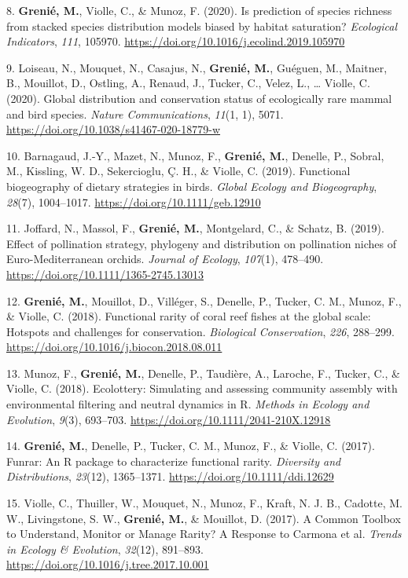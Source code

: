 \documentclass[10pt,a4paper,]{article}
\newlength{\cslhangindent}
\newenvironment{CSLReferences}[2] %
 {\begin{list}{}{%
  \setlength{\itemindent}{0pt}
  \setlength{\leftmargin}{0pt}
  \setlength{\parsep}{0pt}
  \ifodd #1
   \setlength{\leftmargin}{\cslhangindent}
   \setlength{\itemindent}{-1\cslhangindent}
  \fi
  \setlength{\itemsep}{#2\baselineskip}}}
 {\end{list}}
\begin{document}
\begin{CSLReferences}{1}{1}
8. \textbf{Grenié, M.}, Violle, C., \& Munoz, F. (2020). Is prediction
of species richness from stacked species distribution models biased by
habitat saturation? \emph{Ecological Indicators}, \emph{111}, 105970.
\url{https://doi.org/10.1016/j.ecolind.2019.105970}

9. Loiseau, N., Mouquet, N., Casajus, N., \textbf{Grenié, M.}, Guéguen,
M., Maitner, B., Mouillot, D., Ostling, A., Renaud, J., Tucker, C.,
Velez, L., \ldots{} Violle, C. (2020). Global distribution and
conservation status of ecologically rare mammal and bird species.
\emph{Nature Communications}, \emph{11}(1, 1), 5071.
\url{https://doi.org/10.1038/s41467-020-18779-w}

10. Barnagaud, J.-Y., Mazet, N., Munoz, F., \textbf{Grenié, M.},
Denelle, P., Sobral, M., Kissling, W. D., Sekercioglu, Ç. H., \& Violle,
C. (2019). Functional biogeography of dietary strategies in birds.
\emph{Global Ecology and Biogeography}, \emph{28}(7), 1004--1017.
\url{https://doi.org/10.1111/geb.12910}

11. Joffard, N., Massol, F., \textbf{Grenié, M.}, Montgelard, C., \&
Schatz, B. (2019). Effect of pollination strategy, phylogeny and
distribution on pollination niches of Euro-Mediterranean orchids.
\emph{Journal of Ecology}, \emph{107}(1), 478--490.
\url{https://doi.org/10.1111/1365-2745.13013}

12. \textbf{Grenié, M.}, Mouillot, D., Villéger, S., Denelle, P.,
Tucker, C. M., Munoz, F., \& Violle, C. (2018). Functional rarity of
coral reef fishes at the global scale: Hotspots and challenges for
conservation. \emph{Biological Conservation}, \emph{226}, 288--299.
\url{https://doi.org/10.1016/j.biocon.2018.08.011}

13. Munoz, F., \textbf{Grenié, M.}, Denelle, P., Taudière, A., Laroche,
F., Tucker, C., \& Violle, C. (2018). Ecolottery: Simulating and
assessing community assembly with environmental filtering and neutral
dynamics in R. \emph{Methods in Ecology and Evolution}, \emph{9}(3),
693--703. \url{https://doi.org/10.1111/2041-210X.12918}

14. \textbf{Grenié, M.}, Denelle, P., Tucker, C. M., Munoz, F., \&
Violle, C. (2017). Funrar: An R package to characterize functional
rarity. \emph{Diversity and Distributions}, \emph{23}(12), 1365--1371.
\url{https://doi.org/10.1111/ddi.12629}

15. Violle, C., Thuiller, W., Mouquet, N., Munoz, F., Kraft, N. J. B.,
Cadotte, M. W., Livingstone, S. W., \textbf{Grenié, M.}, \& Mouillot, D.
(2017). A Common Toolbox to Understand, Monitor or Manage Rarity? A
Response to Carmona et al. \emph{Trends in Ecology \& Evolution},
\emph{32}(12), 891--893.
\url{https://doi.org/10.1016/j.tree.2017.10.001}

\end{CSLReferences}
\end{document}
